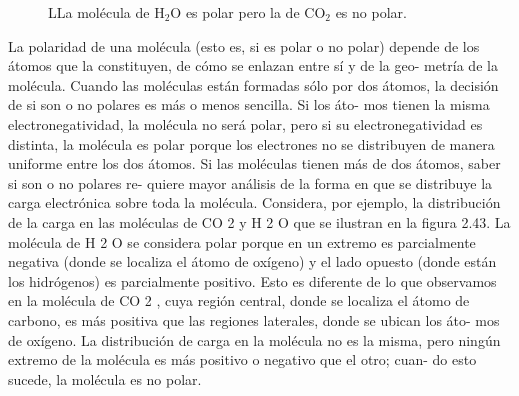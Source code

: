 \documentclass[12pt]{guia}
\begin{document}
\begin{questions}
{\begin{tcolorbox}
\begin{figure}[H]
                \caption{LLa molécula de H$_2$O es polar pero la de CO$_2$ es no polar.}
                \label{fig:20230321055646}
            \end{figure}
            La polaridad de una molécula (esto es, si es polar o no polar) depende
            de los átomos que la constituyen, de cómo se enlazan entre sí y de la geo-
            metría de la molécula. Cuando las moléculas están formadas sólo por dos
            átomos, la decisión de si son o no polares es más o menos sencilla. Si los áto-
            mos tienen la misma electronegatividad, la molécula no será polar, pero si
            su electronegatividad es distinta, la molécula es polar porque los electrones
            no se distribuyen de manera uniforme entre los dos átomos.
            Si las moléculas tienen más de dos átomos, saber si son o no polares re-
            quiere mayor análisis de la forma en que se distribuye la carga electrónica
            sobre toda la molécula. Considera, por ejemplo, la distribución de la carga
            en las moléculas de CO 2 y H 2 O que se ilustran en la figura 2.43. La molécula
            de H 2 O se considera polar porque en un extremo es parcialmente negativa
            (donde se localiza el átomo de oxígeno) y el lado opuesto (donde están los
            hidrógenos) es parcialmente positivo. Esto es diferente de lo que observamos
            en la molécula de CO 2 , cuya región central, donde se localiza el átomo de
            carbono, es más positiva que las regiones laterales, donde se ubican los áto-
            mos de oxígeno. La distribución de carga en la molécula no es la misma, pero
            ningún extremo de la molécula es más positivo o negativo que el otro; cuan-
            do esto sucede, la molécula es no polar.
        \end{tcolorbox}
    }
\end{questions}
\end{document}
